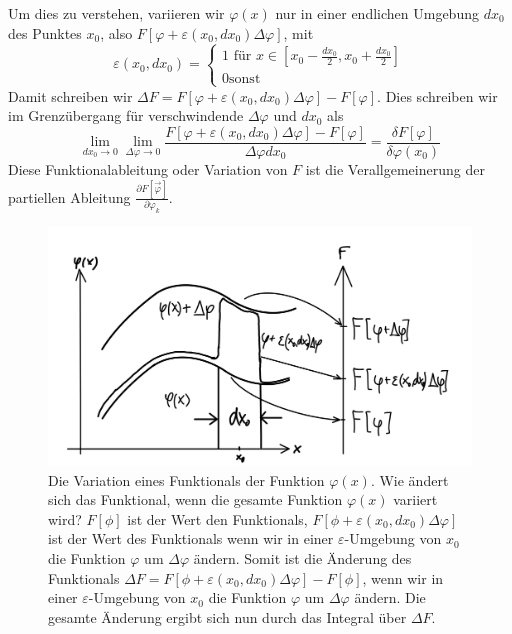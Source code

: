Um dies zu verstehen, variieren wir $\varphi(x)$ nur in einer endlichen
Umgebung $dx_0$ des Punktes $x_0$, also
$F[\varphi+\varepsilon(x_0,dx_0)\Delta\varphi]$, mit 
  \begin{equation}\label{eq:umgebungeps}
    \varepsilon(x_0,dx_0)=\left\{\begin{matrix}1\text{ für
    }x\in[x_0-\frac{dx_0}{2},x_0+\frac{dx_0}{2}]\\ 0 \text{
    sonst}\end{matrix}\right.
  \end{equation}
Damit schreiben wir $\Delta F=F[\varphi +\varepsilon(x_0,dx_0) \Delta\varphi]
-F[\varphi]$. Dies schreiben wir im Grenzübergang für verschwindende
$\Delta\varphi$ und $dx_0$ als
\begin{equation}\label{eq:Variationsableitung}
  \lim_{dx_0\rightarrow 0}\lim_{\Delta\varphi\rightarrow 0}
      \frac{F[\varphi+\varepsilon(x_0,dx_0)\Delta\varphi]-F[\varphi]}{\Delta\varphi dx_0}
    =\frac{\delta F[\varphi]}{\delta\varphi(x_0)}
\end{equation} 
Diese Funktionalableitung oder Variation von $F$ ist die Verallgemeinerung der
partiellen Ableitung $\frac{\partial F[\vec{\varphi}]}{\partial\varphi_k}$.
%
\begin{figure}[!h] 
 \begin{center}
  \includegraphics[height=0.4\textwidth]{fig/Variation.jpeg}
  \caption{Die Variation eines Funktionals der Funktion $\varphi(x)$. Wie
    ändert sich das Funktional, wenn die gesamte Funktion $\varphi(x)$ variiert
    wird? $F[\phi]$ ist der Wert den Funktionals,
    $F[\phi+\varepsilon(x_0,dx_0)\Delta\varphi]$ ist der Wert des Funktionals
    wenn wir in einer $\varepsilon$-Umgebung von $x_0$ die Funktion $\varphi$
    um $\Delta\varphi$ ändern. Somit ist die Änderung des Funktionals $\Delta
    F=F[\phi+\varepsilon(x_0,dx_0)\Delta\varphi]-F[\phi]$, wenn wir in einer
    $\varepsilon$-Umgebung von $x_0$ die Funktion $\varphi$ um $\Delta\varphi$
    ändern. Die gesamte Änderung ergibt sich nun durch das Integral über $\Delta
    F$.\label{fig:variation}}
 \end{center}
\end{figure}
